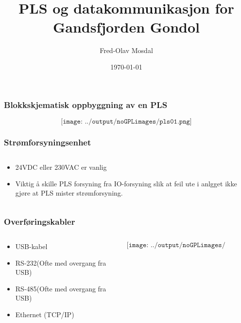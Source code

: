 \documentclass[aspectratio=169,xcolor=dvipsnames]{beamer}
\title[PLS]{PLS og datakommunikasjon for Gandsfjorden Gondol} %
\author[Fred-Olav] {Fred-Olav Mosdal}
\institute[Gand VGS] %
{
    Gand VGS \\
    VG3 Automasjon }
\date{\today} %
\begin{document}
\begin{frame}
\titlepage
\end{frame}






\begin{frame}
	\frametitle{Blokkskjematisk oppbyggning av en PLS}
	$$\texttt{[image: ../output/noGPLimages/pls01.png]}$$
\end{frame}
\begin{frame}
	\frametitle{Strømforsyningsenhet}
	\begin{columns}
		\begin{column}{0.5\textwidth}
			\begin{itemize}
				\item 24VDC eller 230VAC er vanlig
				\item Viktig å skille PLS forsyning fra IO-forsyning slik at feil ute i anlgget ikke gjøre at PLS mister strømforsyning. 
			\end{itemize}

			
		\end{column}

		\begin{column}{0.5\textwidth}
		\end{column}
	\end{columns}
\end{frame}

\begin{frame}
	\frametitle{Overføringskabler}
	\begin{columns}
		\begin{column}{0.5\textwidth}
			\begin{itemize}
				\item USB-kabel
				\item RS-232(Ofte med overgang fra USB)
				\item RS-485(Ofte med overgang fra USB)
				\item Ethernet (TCP/IP)
			\end{itemize}

			
		\end{column}

		\begin{column}{0.5\textwidth}
	$$\texttt{[image: ../output/noGPLimages/pls02.png]}$$
		\end{column}
	\end{columns}
\end{frame}
\end{document}
